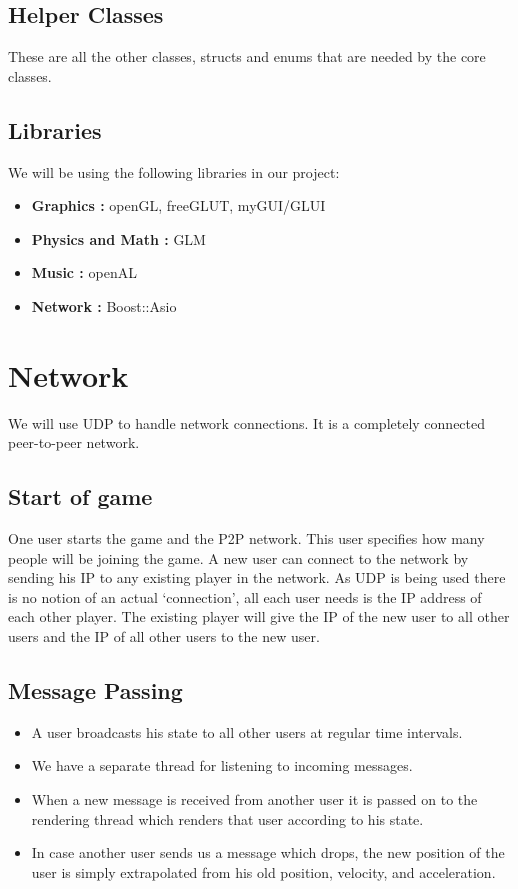 \documentclass[]{article}
\begin{document}
\subsection{Helper Classes}
These are all the other classes, structs and enums that are needed by the core classes.

\vfill
\subsection{Libraries}
We will be using the following libraries in our project:
\begin{itemize}
\item \textbf{Graphics : }openGL, freeGLUT, myGUI/GLUI
\item \textbf{Physics and Math : }GLM
\item \textbf{Music : }openAL
\item \textbf{Network : }Boost::Asio
\end{itemize}
\section{Network}
We will use UDP to handle network connections. It is a completely connected peer-to-peer network.
\subsection{Start of game}
One user starts the game and the P2P network. This user specifies how many people will be joining the game. A new user can connect to the network by sending his IP to any existing player in the network. As UDP is being used there is no notion of an actual `connection', all each user needs is the IP address of each other player. The existing player will give the IP of the new user to all other users and the IP of all other users to the new user.
\subsection{Message Passing}
\begin{itemize}
\item A user broadcasts his state to all other users at regular time intervals.
\item We have a separate thread for listening to incoming messages. 
\item When a new message is received from another user it is passed on to the rendering thread which renders that user according to his state.
\item In case another user sends us a message which drops, the new position of the user is simply extrapolated from his old position, velocity, and acceleration.
\end{itemize}
\end{document}
